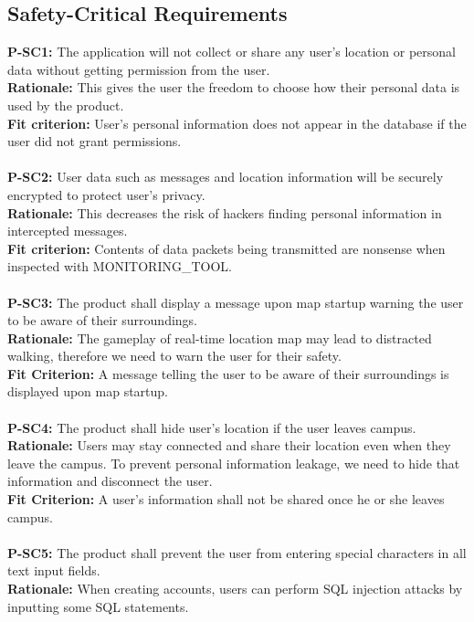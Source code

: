 \documentclass[12pt]{article}
\begin{document}
\subsection{Safety-Critical Requirements}
  \textbf{P-SC1:} The application will not collect or share any user’s location or personal data without getting permission from the user.\\
  \textbf{Rationale:} This gives the user the freedom to choose how their personal data is used by the product.\\
  \textbf{Fit criterion:} User’s personal information does not appear in the database if the user did not grant permissions.\\\\
  \textbf{P-SC2:} User data such as messages and location information will be securely encrypted to protect user’s privacy.\\
  \textbf{Rationale:} This decreases the risk of hackers finding personal information in intercepted messages.\\
  \textbf{Fit criterion:} Contents of data packets being transmitted are nonsense when inspected with MONITORING\_TOOL.\\\\
  \textbf{P-SC3:} The product shall display a message upon map startup warning the user to be aware of their surroundings.\\
  \textbf{Rationale:} The gameplay of real-time location map may lead to distracted walking, therefore we need to warn the user for their safety.\\
  \textbf{Fit Criterion:} A message telling the user to be aware of their surroundings is displayed upon map startup.\\\\
  \textbf{P-SC4:} The product shall hide user's location if the user leaves campus.\\
  \textbf{Rationale:} Users may stay connected and share their location even when they leave the campus. To prevent personal information leakage, we need to hide that information and disconnect the user.\\
  \textbf{Fit Criterion:} A user's information shall not be shared once he or she leaves campus.\\\\
  \textbf{P-SC5:} The product shall prevent the user from entering special characters in all text input fields.\\
  \textbf{Rationale:} When creating accounts, users can perform SQL injection attacks by inputting some SQL statements.\\
\end{document}
